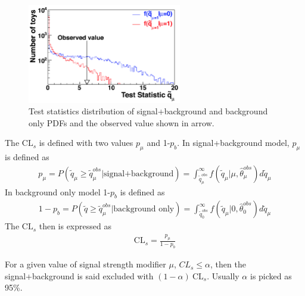 \begin{figure}[!tbp] 
\centering
\includegraphics[width=0.6\textwidth]{chapter7/Test_statistics.png}
\caption{Test statistics distribution of signal+background and background only PDFs and the observed value shown in arrow.}
\label{fig:teststatistics}
\end{figure}
 
The $\textrm{CL}_{s}$ is defined with two values $p_{\mu}$ and 1-$p_{b}$. In signal+background model, $p_{\mu}$ is defined as
\begin{align*}
p_{\mu}=P(\tilde{q}_{\mu}\geq  \tilde{q}_{\mu}^{obs}  |\textrm{signal+background})=\int^{\infty}_{\tilde{q}_{\mu}^{obs}}f(\tilde{q}_{\mu}|\mu,\hat{\theta}_{\mu}^{obs})d \tilde{q}_{\mu}
\end{align*}
In background only model 1-$p_{b}$ is defined as
\begin{align*}
1-p_{b}=P(\tilde{q}\geq  \tilde{q}_{\mu}^{obs} | \textrm{background only})=\int^{\infty}_{\tilde{q}_{0}^{obs}}f(\tilde{q}_{\mu}|0,\hat{\theta}_{0}^{obs})d \tilde{q}_{\mu}
\end{align*}
The $\textrm{CL}_{s}$ then is expressed as
\begin{align*}
\textrm{CL}_{s}=\frac{p_{\mu}}{1-p_{b}}
\end{align*}

For a given value of signal strength modifier $\mu$, $CL_{s}\leq\alpha$, then the signal+background is said excluded with $(1-\alpha)~ \textrm{CL}_{s}$. Usually $\alpha$ is picked as 95\%.

